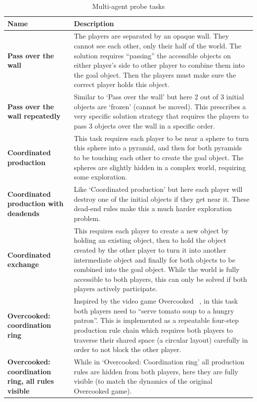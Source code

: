 \documentclass[11pt, a4paper, logo, copyright]{deepmind}
\begin{document}
\begin{appendix}
\renewcommand*{\arraystretch}{1.4}
\begin{longtable}{|>{\raggedright}p{4cm}|p{12cm}|}
\caption{Multi-agent probe tasks}
    \label{probe-task-desc-multi-agent}
    \\ \hline
\textbf{Name} & \textbf{Description} \\ \hline
\textbf{Pass over the wall} & The players are separated by an opaque wall. They cannot see each other, only their half of the world. The solution requires ``passing'' the accessible objects on either player's side to other player to combine them into the goal object. Then the players must make sure the correct player holds this object. \\ \hline
\textbf{Pass over the wall repeatedly} & Similar to `Pass over the wall' but here 2 out of 3 initial objects are `frozen' (cannot be moved). This prescribes a very specific solution strategy that requires the players to pass 3 objects over the wall in a specific order. \\ \hline
\textbf{Coordinated production} & This task requires each player to be near a sphere to turn this sphere into a pyramid, and then for both pyramids to be touching each other to create the goal object. The spheres are slightly hidden in a complex world, requiring some exploration. \\ \hline
\textbf{Coordinated production with deadends} & Like `Coordinated production' but here each player will destroy one of the initial objects if they get near it. These dead-end rules make this a much harder exploration problem. \\ \hline
\textbf{Coordinated exchange} & This requires each player to create a new object by holding an existing object, then to hold the object created by the other player to turn it into another intermediate object and finally for both objects to be combined into the goal object. While the world is fully accessible to both players, this can only be solved if both players actively participate. \\ \hline
\textbf{Overcooked: coordination ring} & Inspired by the video game Overcooked ~\citep{https://doi.org/10.48550/arxiv.1910.05789, strouse2021collaborating}, in this task both players need to ``serve tomato soup to a hungry patron''. This is implemented as a repeatable four-step production rule chain which requires both players to traverse their shared space (a circular layout) carefully in order to not block the other player. \\ \hline
\textbf{Overcooked: coordination ring, all rules visible} & While in `Overcooked: Coordination ring' all production rules are hidden from both players, here they are fully visible (to match the dynamics of the original Overcooked game). \\ \hline

\end{longtable}
\end{appendix}
\end{document}
